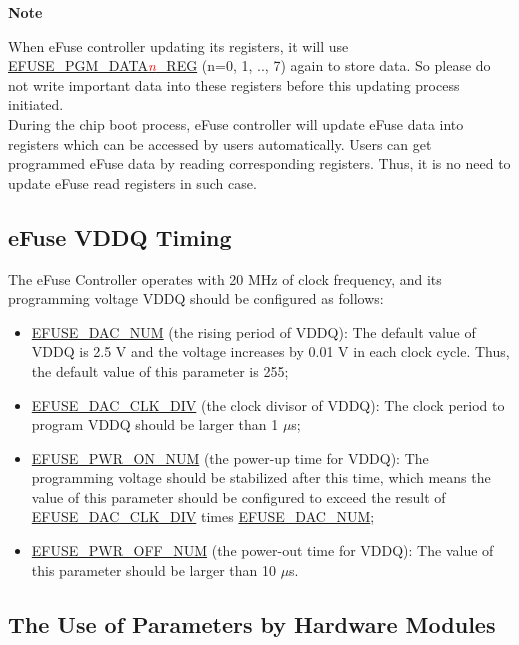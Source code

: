 \documentclass[main\_\_EN.tex]{subfiles}
\begin{document}
{\bfseries Note}


When eFuse controller updating its registers, it will use \hyperref[regdesc:EFUSEPGMDATA0REG]{EFUSE\_PGM\_DATA\textcolor{red}{\it{n}}\_REG} (n=0, 1, .., 7) again to store data. So please do not write important data into these registers before this updating process initiated. \\
During the chip boot process, eFuse controller will update eFuse data into registers which can be accessed by users automatically. Users can get programmed eFuse data by reading corresponding registers. Thus, it is no need to update eFuse read registers in such case.

\subsection{eFuse VDDQ Timing}
\label{sec:efuse-vddq-timing}

The eFuse Controller operates with 20 MHz of clock frequency, and its programming voltage VDDQ should be configured as follows:

\begin{itemize}
    \item \hyperref[fielddesc:EFUSEDACNUM]{EFUSE\_DAC\_NUM} (the rising period of VDDQ): The default value of VDDQ is 2.5 V and the voltage increases by 0.01 V in each clock cycle. Thus, the default value of this parameter is 255;
    \item \hyperref[fielddesc:EFUSEDACCLKDIV]{EFUSE\_DAC\_CLK\_DIV} (the clock divisor of VDDQ): The clock period to program VDDQ should be larger than 1 $\mu$s;
    \item \hyperref[fielddesc:EFUSEPWRONNUM]{EFUSE\_PWR\_ON\_NUM} (the power-up time for VDDQ): The programming voltage should be stabilized after this time, which means the value of this parameter should be configured to exceed the result of \hyperref[fielddesc:EFUSEDACCLKDIV]{EFUSE\_DAC\_CLK\_DIV} times \hyperref[fielddesc:EFUSEDACNUM]{EFUSE\_DAC\_NUM};
    \item \hyperref[fielddesc:EFUSEPWROFFNUM]{EFUSE\_PWR\_OFF\_NUM} (the power-out time for VDDQ): The value of this parameter should be larger than 10 $\mu$s.
\end{itemize}



\subsection{The Use of Parameters by Hardware Modules}
\end{document}
